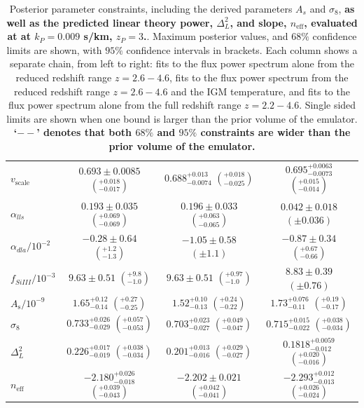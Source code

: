 \begin{table}
\begin{tabular} {| l | c | c | c|}
$v_\mathrm{scale}$ & $0.693\pm 0.0085$  $\left(^{+0.018}_{-0.017}\right)$    & $0.688^{+0.013}_{-0.0074}$  $\left(^{+0.018}_{-0.025}\right)$    & $0.695^{+0.0063}_{-0.0073}$  $\left(^{+0.015}_{-0.014} \right)$     \\
$\alpha_{lls}   $ & $0.193\pm 0.035$ $\left(^{+0.069}_{-0.069}\right)$          & $0.196\pm 0.033$  $\left(^{+0.063}_{-0.065}\right)   $     & $0.042\pm 0.018$  $\left(\pm 0.036\right)$   \\
$\alpha_{dla}/10^{-2}   $ & $-0.28\pm 0.64$ $\left(^{+1.2}_{-1.3}\right)$ & $-1.05\pm 0.58$ $\left(\pm 1.1\right)  $    & $-0.87\pm 0.34         $   $\left(^{+0.67}_{-0.66}\right)$  \\
$f_{SiIII}/10^{-3} $ & $9.63\pm 0.51$ $\left(^{+9.8}_{-1.0}\right)$              & $9.63\pm 0.51        $       $\left(^{+0.97}_{-1.0}\right) $          & $8.83\pm 0.39        $  $\left(\pm 0.76\right)$\\
\hline
$A_\mathrm{s}/10^{-9}      $ & $1.65^{+0.12}_{-0.14}$ $\left(^{+0.27}_{-0.25}\right)$ & $1.52^{+0.10}_{-0.13}$ $\left(^{+0.24}_{-0.22}\right)$  & $1.73^{+0.076}_{-0.11}$ $\left(^{+0.19}_{-0.17}\right)$   \\
$\sigma_8$ & $0.733^{+0.026}_{-0.029}$ $\left(^{+0.057}_{-0.053}\right)$ &  $0.703^{+0.023}_{-0.027}   $ $\left(^{+0.049}_{-0.047}\right)$ & $0.715^{+0.015}_{-0.022}$  $\left(^{+0.038}_{-0.034}\right)$  \\
$\Delta_L^2$     & $0.226^{+0.017}_{-0.019}$   $\left(^{+0.038}_{-0.034}\right)$ &  $0.201^{+0.013}_{-0.016}$    $\left(^{+0.029}_{-0.027}\right)$    & $0.1818^{+0.0059}_{-0.012} $ $\left(^{+0.020}_{-0.016}\right)$\\
$n_\mathrm{eff}$ & $-2.180^{+0.026}_{-0.018}$  $\left(^{+0.039}_{-0.043}\right)$ &  $-2.202\pm 0.021$     $\left(^{+0.042}_{-0.041}\right)$       & $-2.293^{+0.012}_{-0.013}  $ $\left(^{+0.026}_{-0.024}\right) $ \\
\hline
\end{tabular}
\caption{\label{table:parameters}
Posterior parameter constraints, including the derived parameters $A_s$ and $\sigma_8$, \textbf{as well as the predicted linear theory power, $\Delta_L^2$, and slope, $n_\mathrm{eff}$, evaluated at at $k_P = 0.009$ s/km, $z_P=3$.}.
Maximum posterior values, and $68\%$ confidence limits are shown, with $95\%$ confidence intervals in brackets.
Each column shows a separate chain, from left to right: fits to the flux power spectrum alone from the reduced redshift range $z=2.6 - 4.6$, fits to the flux power spectrum from the reduced redshift range $z=2.6 - 4.6$ and the IGM temperature, and fits to the flux power spectrum alone from the full redshift range $z=2.2 - 4.6$.
Single sided limits are shown when one bound is larger than the prior volume of the emulator. \textbf{`$--$' denotes that both $68\%$ and $95\%$ constraints are wider than the prior volume of the emulator.}
}
\end{table}


